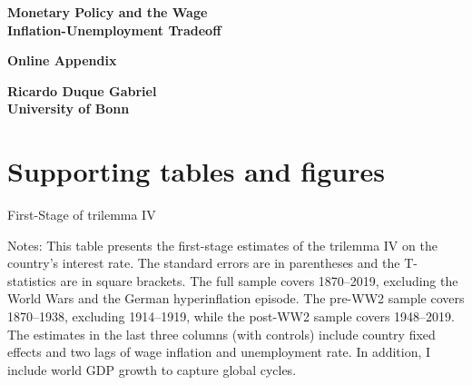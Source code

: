 \documentclass[12pt]{article}
\newcommand{\annote}[1]{\parbox{\textwidth}{\renewcommand{\baselinestretch}{1.0}\vspace{12pt} \footnotesize Notes: #1}}
\begin{document}
\begin{appendices}

\setcounter{page}{1}
\setcounter{table}{0}
\setcounter{figure}{0}
\renewcommand{\thepage}{\roman{page}}
\renewcommand{\thetable}{\Alph{section}.\arabic{table}}
\renewcommand{\thefigure}{\Alph{section}.\arabic{figure}}
\renewcommand{\theEquation}{\Alph{section}.\arabic{Equation}}

\begin{titlepage}

\begin{center}
\textbf{\huge{Monetary Policy and the Wage \\ Inflation-Unemployment Tradeoff}}\\

\vspace{2em}

\textbf{\huge{Online Appendix}}\\

\vspace{2em}

\textbf{\Large{Ricardo Duque Gabriel \\ University of Bonn}}\\
\end{center}

\thispagestyle{empty}

\end{titlepage}

\section{Supporting tables and figures}




\clearpage



\clearpage



\clearpage



\begin{table}[ht]
\centering
\caption{First-Stage of trilemma IV} \label{T:First_Stage}
\vspace{1ex}
\def\sym#1{\ifmmode^{#1}\else\(^{#1}\)\fi}

\annote{This table presents the first-stage estimates of the trilemma IV on the country's interest rate. The standard errors are in parentheses and the T-statistics are in square brackets. The full sample covers 1870–2019, excluding the World Wars and the German hyperinflation episode. The pre-WW2 sample covers 1870–1938, excluding 1914–1919, while the post-WW2 sample covers 1948–2019. The estimates in the last three columns (with controls) include country fixed effects and two lags of wage inflation and unemployment rate. In addition, I include world GDP growth to capture global cycles.}
\end{table}


\end{appendices}
\end{document}
